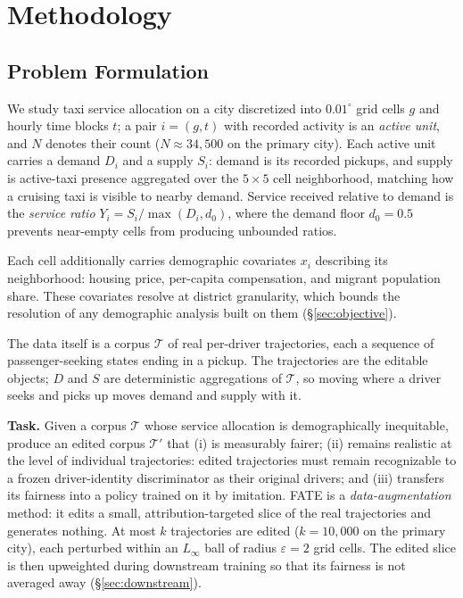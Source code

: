 \section{Methodology}\label{sec:method}

\subsection{Problem Formulation}\label{sec:problem}

We study taxi service allocation on a city discretized into $0.01^{\circ}$ grid
cells $g$ and hourly time blocks $t$; a pair $i=(g,t)$ with recorded activity is
an \emph{active unit}, and $N$ denotes their count ($N \approx 34{,}500$ on the
primary city). Each active unit carries a demand $D_i$ and a supply $S_i$:
demand is its recorded pickups, and supply is active-taxi presence
aggregated over the $5{\times}5$ cell neighborhood, matching how a cruising
taxi is visible to nearby demand. Service received relative to demand is the \emph{service ratio}
$Y_i = S_i / \max(D_i, d_0)$, where the demand floor $d_0 = 0.5$ prevents
near-empty cells from producing unbounded ratios.

Each cell additionally carries demographic covariates $x_i$ describing its
neighborhood: housing price, per-capita compensation, and migrant population
share. These covariates resolve at district granularity, which bounds the 
resolution of any demographic analysis built on them (\S\ref{sec:objective}).

The data itself is a corpus $\mathcal{T}$ of real per-driver trajectories, each
a sequence of passenger-seeking states ending in a pickup. The trajectories are 
the editable objects; $D$ and $S$ are
deterministic aggregations of $\mathcal{T}$, so moving where a driver seeks and
picks up moves demand and supply with it.

\textbf{Task.} Given a corpus $\mathcal{T}$ whose service allocation is
demographically inequitable, produce an edited corpus $\mathcal{T}'$ that
(i) is measurably fairer; (ii) remains realistic at the level of individual
trajectories: edited trajectories must remain recognizable
to a frozen driver-identity discriminator as their original drivers; and
(iii) transfers its fairness into a policy trained on it by imitation. FATE
is a \emph{data-augmentation} method: it edits a small, attribution-targeted
slice of the real trajectories and generates nothing. At most $k$
trajectories are edited ($k = 10{,}000$ on the primary city), each perturbed
within an $L_\infty$ ball of radius $\varepsilon = 2$ grid cells.
The edited slice is then upweighted during downstream training so that its
fairness is not averaged away (\S\ref{sec:downstream}).

